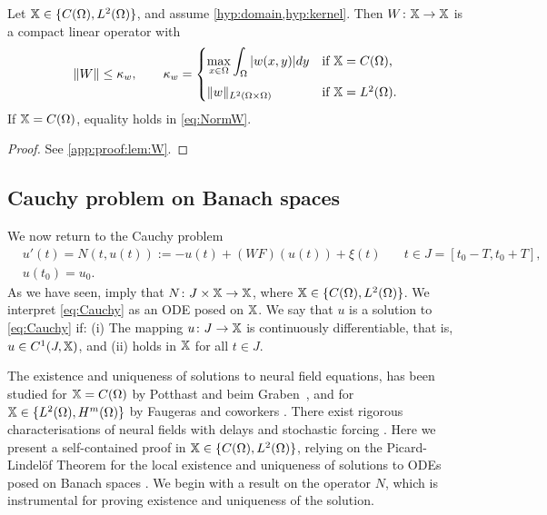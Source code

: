 \documentclass[a4paper,baskervaldx]{daarticle}
\newcommand{\rev}[1]{#1}
\begin{document}
\begin{lemma} \label{lem:W}
  Let $\mathbb{X} \in \{C(\Omega),L^2(\Omega)\}$, and assume
  \cref{hyp:domain,hyp:kernel}. Then $W \colon \mathbb{X} \to \mathbb{X}$ is a compact linear
  operator with
  \begin{equation}\label{eq:NormW}
    \| W \| \leq \kappa_w, \qquad \kappa_w = 
    \begin{cases}
      \displaystyle{\max_{x \in \Omega} \int_\Omega | w(x,y)| dy} & \text{if $\mathbb{X} = C(\Omega)$,} \\[1em]
      \| w \|_{L^2(\Omega \times \Omega)}          & \text{if $\mathbb{X} = L^2(\Omega)$.} 
    \end{cases}
    \end{equation}
    If $\mathbb{X} = C(\Omega)$, equality holds in \cref{eq:NormW}.
\end{lemma}
\begin{proof}
  See \cref{app:proof:lem:W}.
\end{proof}

\subsection{Cauchy problem on Banach spaces} We now return to the
Cauchy problem
\begin{equation}\label{eq:Cauchy}
  \begin{aligned}
    & u'(t) = N(t,u(t)) :=-u(t) + (WF)(u(t)) + \xi(t)  \quad & t \in \rev{J = [t_0-T,t_0+T]}, \\
    & u(t_0) = u_0.
  \end{aligned}
\end{equation}
As we have seen,  imply that $N \colon J
\times \mathbb{X} \to \mathbb{X}$, where $\mathbb{X} \in \{ C(\Omega), L^2(\Omega)\}$. We interpret
\cref{eq:Cauchy} as an ODE posed on $\mathbb{X}$. We say that $u$ is a solution to
\cref{eq:Cauchy} if: (i) The mapping $u \colon J \to \mathbb{X}$ is continuously
differentiable, that is, $u \in C^1(J,\mathbb{X})$, and (ii)  holds in $\mathbb{X}$
for all $t \in J$.

The existence and uniqueness of solutions to neural field equations, has been studied for
$\mathbb{X} =C(\Omega)$ by Potthast and beim Graben~\cite{Potthast:2010kb}, and for
$\mathbb{X} \in \{L^2(\Omega),H^m(\Omega)\}$ by Faugeras and coworkers
\cite{faugeras2008absolute,Veltz:2010}. There exist rigorous characterisations of neural
fields with delays \cite{Faye.2010,Visser.2017} and stochastic forcing
\cite{faugerasStochastic2015,maclaurin2020wandering}.
%
Here we present a self-contained proof in $\mathbb{X} \in
\{C(\Omega),L^2(\Omega)\}$, relying on the
Picard-Lindel\"of Theorem for the local existence and uniqueness of solutions to ODEs
posed on Banach spaces \cite[Theorem 5.2.4]{atkinson2005theoretical}. We begin with
a result on the operator $N$, which is instrumental for proving existence and
uniqueness of the solution.
\end{document}

